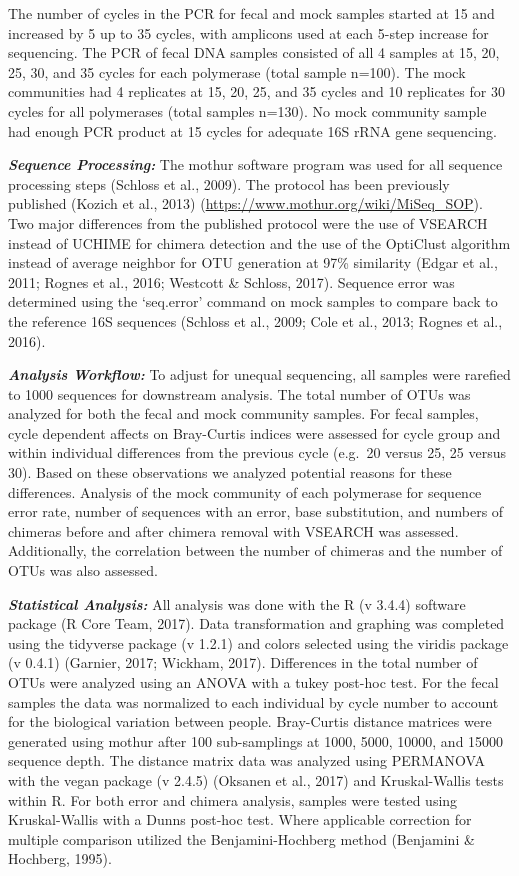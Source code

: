 \documentclass[11pt,]{article}
\begin{document}
The number of cycles in the PCR for fecal and mock samples started at 15
and increased by 5 up to 35 cycles, with amplicons used at each 5-step
increase for sequencing. The PCR of fecal DNA samples consisted of all 4
samples at 15, 20, 25, 30, and 35 cycles for each polymerase (total
sample n=100). The mock communities had 4 replicates at 15, 20, 25, and
35 cycles and 10 replicates for 30 cycles for all polymerases (total
samples n=130). No mock community sample had enough PCR product at 15
cycles for adequate 16S rRNA gene sequencing.

\textbf{\emph{Sequence Processing:}} The mothur software program was
used for all sequence processing steps (Schloss et al., 2009). The
protocol has been previously published (Kozich et al., 2013)
(\url{https://www.mothur.org/wiki/MiSeq_SOP}). Two major differences
from the published protocol were the use of VSEARCH instead of UCHIME
for chimera detection and the use of the OptiClust algorithm instead of
average neighbor for OTU generation at 97\% similarity (Edgar et al.,
2011; Rognes et al., 2016; Westcott \& Schloss, 2017). Sequence error
was determined using the `seq.error' command on mock samples to compare
back to the reference 16S sequences (Schloss et al., 2009; Cole et al.,
2013; Rognes et al., 2016).

\textbf{\emph{Analysis Workflow:}} To adjust for unequal sequencing, all
samples were rarefied to 1000 sequences for downstream analysis. The
total number of OTUs was analyzed for both the fecal and mock community
samples. For fecal samples, cycle dependent affects on Bray-Curtis
indices were assessed for cycle group and within individual differences
from the previous cycle (e.g.~20 versus 25, 25 versus 30). Based on
these observations we analyzed potential reasons for these differences.
Analysis of the mock community of each polymerase for sequence error
rate, number of sequences with an error, base substitution, and numbers
of chimeras before and after chimera removal with VSEARCH was assessed.
Additionally, the correlation between the number of chimeras and the
number of OTUs was also assessed.

\textbf{\emph{Statistical Analysis:}} All analysis was done with the R
(v 3.4.4) software package (R Core Team, 2017). Data transformation and
graphing was completed using the tidyverse package (v 1.2.1) and colors
selected using the viridis package (v 0.4.1) (Garnier, 2017; Wickham,
2017). Differences in the total number of OTUs were analyzed using an
ANOVA with a tukey post-hoc test. For the fecal samples the data was
normalized to each individual by cycle number to account for the
biological variation between people. Bray-Curtis distance matrices were
generated using mothur after 100 sub-samplings at 1000, 5000, 10000, and
15000 sequence depth. The distance matrix data was analyzed using
PERMANOVA with the vegan package (v 2.4.5) (Oksanen et al., 2017) and
Kruskal-Wallis tests within R. For both error and chimera analysis,
samples were tested using Kruskal-Wallis with a Dunns post-hoc test.
Where applicable correction for multiple comparison utilized the
Benjamini-Hochberg method (Benjamini \& Hochberg, 1995).
\end{document}
